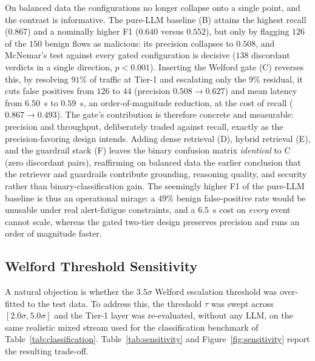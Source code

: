 On balanced data the configurations no longer collapse onto a single point, and the contrast is informative. The pure-LLM baseline (B) attains the highest recall ($0.867$) and a nominally higher F1 ($0.640$ versus $0.552$), but only by flagging $126$ of the $150$ benign flows as malicious: its precision collapses to $0.508$, and McNemar's test against every gated configuration is decisive ($138$ discordant verdicts in a single direction, $p < 0.001$). Inserting the Welford gate (C) reverses this, by resolving $91\%$ of traffic at Tier-1 and escalating only the $9\%$ residual, it cuts false positives from $126$ to $44$ (precision $0.508 \rightarrow 0.627$) and mean latency from $6.50$~s to $0.59$~s, an order-of-magnitude reduction, at the cost of recall ($0.867 \rightarrow 0.493$). The gate's contribution is therefore concrete and measurable: precision and throughput, deliberately traded against recall, exactly as the precision-favoring design intends. Adding dense retrieval (D), hybrid retrieval (E), and the guardrail stack (F) leaves the binary confusion matrix \emph{identical} to C (zero discordant pairs), reaffirming on balanced data the earlier conclusion that the retriever and guardrails contribute grounding, reasoning quality, and security rather than binary-classification gain. The seemingly higher F1 of the pure-LLM baseline is thus an operational mirage: a $49\%$ benign false-positive rate would be unusable under real alert-fatigue constraints, and a $6.5$~s cost on \emph{every} event cannot scale, whereas the gated two-tier design preserves precision and runs an order of magnitude faster.

\subsection{Welford Threshold Sensitivity}
A natural objection is whether the $3.5\sigma$ Welford escalation threshold was over-fitted to the test data. To address this, the threshold $\tau$ was swept across $[2.0\sigma, 5.0\sigma]$ and the Tier-1 layer was re-evaluated, without any LLM, on the same realistic mixed stream used for the classification benchmark of Table~\ref{tab:classification}. Table~\ref{tab:sensitivity} and Figure~\ref{fig:sensitivity} report the resulting trade-off.

